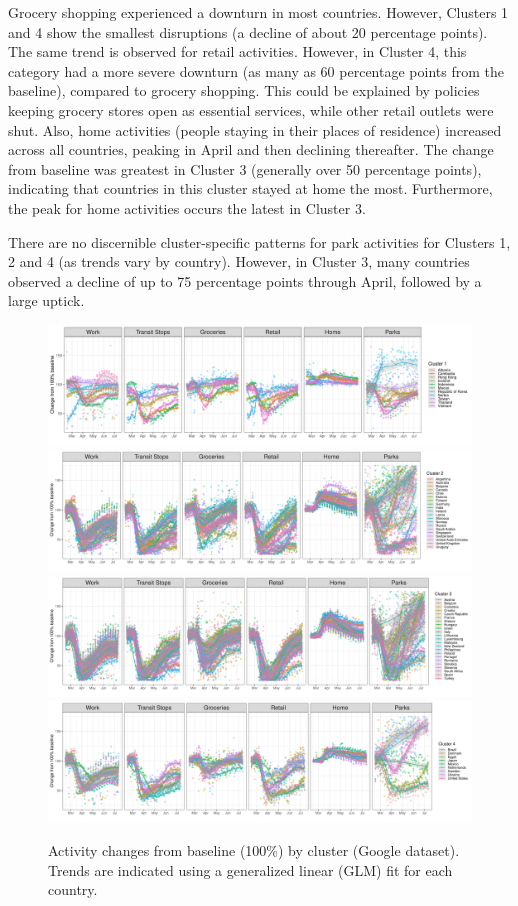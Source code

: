 \documentclass[titlepage,oneside,12pt]{article}
\newcommand{\?}{\stackrel{?}{=}}
\begin{document}
Grocery shopping experienced a downturn in most countries. However, Clusters 1 and 4 show the smallest disruptions (a decline of about 20 percentage points).
The same trend is observed for retail activities.
However, in Cluster 4, this category had a more severe downturn (as many as 60 percentage points from the baseline), compared to grocery shopping.
This could be explained by policies keeping grocery stores open as essential services, while other retail outlets were shut.
Also, home activities (people staying in their places of residence) increased across all countries, peaking in April and then declining thereafter.
The change from baseline was greatest in Cluster 3 (generally over 50 percentage points), indicating that countries in this cluster stayed at home the most.
Furthermore, the peak for home activities occurs the latest in Cluster 3.

There are no discernible cluster-specific patterns for park activities for Clusters 1, 2 and 4 (as trends vary by country).
However, in Cluster 3, many countries observed a decline of up to 75 percentage points through April, followed by a large uptick.

\begin{figure}[h!]
  \centering
  \includegraphics[width=\textwidth]{c1-activity}
  \includegraphics[width=\textwidth]{c2-activity}
  \includegraphics[width=\textwidth]{c3-activity}
  \includegraphics[width=\textwidth]{c4-activity}
  \caption{Activity changes from baseline (100\%) by cluster (Google dataset).  Trends are indicated using a generalized linear (GLM) fit for each country.}
  \label{fig:act}
\end{figure}
\end{document}
